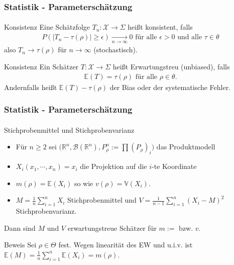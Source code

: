 \documentclass{beamer}
\begin{document}
\begin{frame}
    \frametitle{Statistik - Parameterschätzung}
\framesubtitle{}

\begin{block}{Konsistenz}
Eine Schätzfolge $T_n: \mathcal{X} \to \Sigma$  heißt konsistent, falls
\begin{align*}
P( |T_n - \tau(\rho)  |  \geq \epsilon)  \underset {n \to \infty}{\longrightarrow} 0 \text{ für alle } \epsilon > 0 \text { und alle } \tau \in \theta  
\end{align*}
also $T_n \to \tau(\rho)$ für $n \to \infty$  (stochastisch).
\end{block}
\begin{block}{Konsistenz}
Ein Schätzer $T: \mathcal{X} \to \Sigma$  heißt Erwartungstreu (unbiased), falls
\begin{align*}
\mathbb{E}(T) = \tau(\rho) \text{ für alle } \rho \in \theta.
\end{align*}
Andernfalls heißt $\mathbb{E}(T) - \tau(\rho) $ der Bias oder der systematische Fehler.
\end{block}
 \end{frame}

\begin{frame}
    \frametitle{Statistik - Parameterschätzung}
\framesubtitle{}
\begin{block}{Stichprobenmittel und  Stichprobenvarianz}
\begin{itemize}
\item Für $n \geq 2$ sei  $\biggl ( \mathbb{R}^n, \mathcal{B}(\mathbb{R}^n ), P^n_\rho :=  \prod (P_\rho)_i \biggr)$ das Produktmodell
\item $X_i(x_1, \cdots , x_n) = x_i$ die Projektion auf die $i$-te Koordinate  
\item $m(\rho) =  \mathbb{E}(X_i) $ so wie $v(\rho) =\mathbb{V}(X_i)$. 
\item  $M= \frac{1}{n} \sum_{i=1}^n X_i$ Stichprobenmittel  und $V= \frac{1}{n-1} \sum_{i=1}^n (X_i - M)^2$ Stichprobenvarianz.
\end{itemize}

 Dann sind $M$  und $V$ erwartungstreue Schätzer für $m:=$ bzw. $v$.

\end{block}

\begin{block}{Beweis}
Sei $\rho \in \Theta$ fest. Wegen linearität des EW und u.i.v. ist $\mathbb{E}(M) =\frac{1}{n} \sum_{i=1}^n \mathbb{E}(X_i) = m(\rho) $.
\end{block}


 \end{frame}
\end{document}
